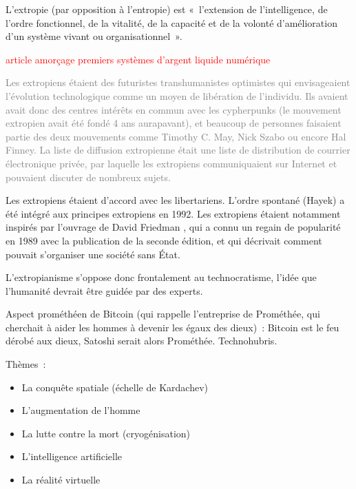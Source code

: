 L'extropie (par opposition à l'entropie) est «~l'extension de l'intelligence, de l'ordre fonctionnel, de la vitalité, de la capacité et de la volonté d'amélioration d'un système vivant ou organisationnel~». %

\textcolor{red}{article amorçage premiers systèmes d'argent liquide numérique}

\textcolor{gray}{Les extropiens étaient des futuristes transhumanistes optimistes qui envisageaient l'évolution technologique comme un moyen de libération de l'individu. Ils avaient avait donc des centres intérêts en commun avec les cypherpunks (le mouvement extropien avait été fondé 4 ans aurapavant), et beaucoup de personnes faisaient partie des deux mouvements comme Timothy C. May, Nick Szabo ou encore Hal Finney. La liste de diffusion extropienne était une liste de distribution de courrier électronique privée, par laquelle les extropiens communiquaient sur Internet et pouvaient discuter de nombreux sujets.}



Les extropiens étaient d'accord avec les libertariens. L'ordre spontané (Hayek) a été intégré aux principes extropiens en 1992. Les extropiens étaient notamment inspirés par l'ouvrage de David Friedman , qui a connu un regain de popularité en 1989 avec la publication de la seconde édition, et qui décrivait comment pouvait s'organiser une société sans État.

L'extropianisme s'oppose donc frontalement au technocratisme, l'idée que l'humanité devrait être guidée par des experts.

Aspect prométhéen de Bitcoin (qui rappelle l'entreprise de Prométhée, qui cherchait à aider les hommes à devenir les égaux des dieux)~: Bitcoin est le feu dérobé aux dieux, Satoshi serait alors Prométhée. Technohubris.

Thèmes~:

\begin{itemize}
    \item La conquête spatiale (échelle de Kardachev)
    \item L'augmentation de l'homme
    \item La lutte contre la mort (cryogénisation)
    \item L'intelligence artificielle
    \item La réalité virtuelle
\end{itemize}


